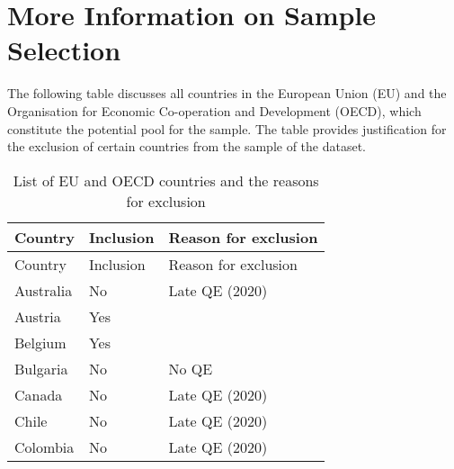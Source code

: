 \documentclass[
  a4paper,
  abstract=true]{scrartcl}
\theoremstyle{definition}
\begin{document}
\section{More Information on Sample Selection}\label{sec-sample}

The following table discusses all countries in the European Union (EU)
and the Organisation for Economic Co-operation and Development (OECD),
which constitute the potential pool for the sample. The table provides
justification for the exclusion of certain countries from the sample of
the dataset.

\begin{longtable}[]{@{}
  >{\raggedright\arraybackslash}p{}
  >{\raggedright\arraybackslash}p{}
  >{\raggedright\arraybackslash}p{}@{}}
\caption{List of EU and OECD countries and the reasons for
exclusion}\tabularnewline
\toprule\noalign{}
\begin{minipage}[b]{\linewidth}\raggedright
Country
\end{minipage} & \begin{minipage}[b]{\linewidth}\raggedright
Inclusion
\end{minipage} & \begin{minipage}[b]{\linewidth}\raggedright
Reason for exclusion
\end{minipage} \\
\midrule\noalign{}
\endfirsthead
\toprule\noalign{}
\begin{minipage}[b]{\linewidth}\raggedright
Country
\end{minipage} & \begin{minipage}[b]{\linewidth}\raggedright
Inclusion
\end{minipage} & \begin{minipage}[b]{\linewidth}\raggedright
Reason for exclusion
\end{minipage} \\
\midrule\noalign{}
\endhead
\bottomrule\noalign{}
\endlastfoot
Australia & No & Late QE (2020) \\
Austria & Yes & \\
Belgium & Yes & \\
Bulgaria & No & No QE \\
Canada & No & Late QE (2020) \\
Chile & No & Late QE (2020) \\
Colombia & No & Late QE (2020) \\

\end{longtable}
\end{document}
